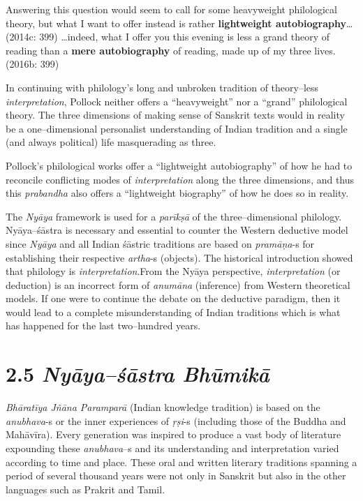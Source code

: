 \begin{myquote}
Answering this question would seem to call for some heavyweight philological theory, but what I want to offer instead is rather \textbf{lightweight autobiography}… (2014c: 399) …indeed, what I offer you this evening is less a grand theory of reading than a \textbf{mere autobiography} of reading, made up of my three lives. (2016b: 399)
\end{myquote}

In continuing with philology’s long and unbroken tradition of theory–less \textit{interpretation}, Pollock neither offers a “heavyweight” nor a “grand” philological theory. The three dimensions of making sense of Sanskrit texts would in reality be a one–dimensional personalist understanding of Indian tradition and a single (and always political) life masquerading as three.

Pollock’s philological works offer a “lightweight autobiography” of how he had to reconcile conflicting modes of \textit{interpretation} along the three dimensions, and thus this \textit{prabandha} also offers a “lightweight biography” of how he does so in reality.

The \textit{Nyāya} framework is used for a \textit{parīkṣā }of the three–dimensional philology. Nyāya–śāstra is necessary and essential to counter the Western deductive model since \textit{Nyāya} and all Indian śāstric traditions are based on \textit{pramāṇa}-s for establishing their respective \textit{artha}-s (objects). The historical introduction showed that philology is \textit{interpretation}.\break From the Nyāya perspective, \textit{interpretation }(or deduction) is an incorrect form of \textit{anumāna} (inference) from Western theoretical models. If one were to continue the debate on the deductive paradigm, then it would lead to a complete misunderstanding of Indian traditions which is what has happened for the last two–hundred years.


\section*{2.5 {\it {\bfseries Nyāya–śāstra Bhūmikā}}}

\textit{Bhāratīya Jñāna Paramparā} (Indian knowledge tradition) is based on the \textit{anubhava}-s or the inner experiences of \textit{ṛṣi}-s (including those of the Buddha and Mahāvīra). Every generation was inspired to produce a vast body of literature expounding these \textit{anubhava}–s and its understanding and interpretation varied according to time and place. These oral and written literary traditions spanning a period of several thousand years were not only in Sanskrit but also in the other languages such as Prakrit and Tamil.

